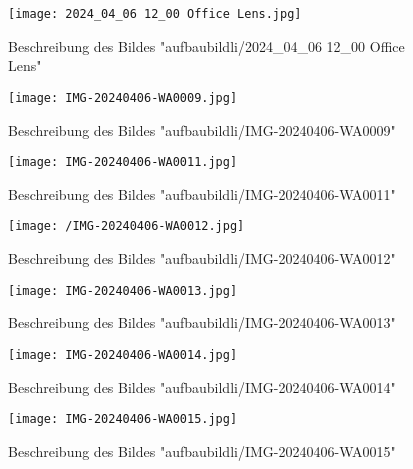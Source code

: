 \begin{figure}[h!]
	\centering
	\texttt{[image: 2024\_04\_06 12\_00 Office Lens.jpg]}
	\caption{Beschreibung des Bildes "aufbaubildli/2024\_04\_06 12\_00 Office Lens"}
	\label{fig:aufbaubildli202404061200OfficeLens}
\end{figure}

\begin{figure}[h!]
	\centering
	\texttt{[image: IMG-20240406-WA0009.jpg]}
	\caption{Beschreibung des Bildes "aufbaubildli/IMG-20240406-WA0009"}
	\label{fig:aufbaubildliIMG20240406WA0009}
\end{figure}

\begin{figure}[h!]
	\centering
	\texttt{[image: IMG-20240406-WA0011.jpg]}
	\caption{Beschreibung des Bildes "aufbaubildli/IMG-20240406-WA0011"}
	\label{fig:aufbaubildliIMG20240406WA0011}
\end{figure}

\begin{figure}[h!]
	\centering
	\texttt{[image: /IMG-20240406-WA0012.jpg]}
	\caption{Beschreibung des Bildes "aufbaubildli/IMG-20240406-WA0012"}
	\label{fig:aufbaubildliIMG20240406WA0012}
\end{figure}

\begin{figure}[h!]
	\centering
	\texttt{[image: IMG-20240406-WA0013.jpg]}
	\caption{Beschreibung des Bildes "aufbaubildli/IMG-20240406-WA0013"}
	\label{fig:aufbaubildliIMG20240406WA0013}
\end{figure}

\begin{figure}[h!]
	\centering
	\texttt{[image: IMG-20240406-WA0014.jpg]}
	\caption{Beschreibung des Bildes "aufbaubildli/IMG-20240406-WA0014"}
	\label{fig:aufbaubildliIMG20240406WA0014}
\end{figure}

\begin{figure}[h!]
	\centering
	\texttt{[image: IMG-20240406-WA0015.jpg]}
	\caption{Beschreibung des Bildes "aufbaubildli/IMG-20240406-WA0015"}
	\label{fig:aufbaubildliIMG20240406WA0015}
\end{figure}
